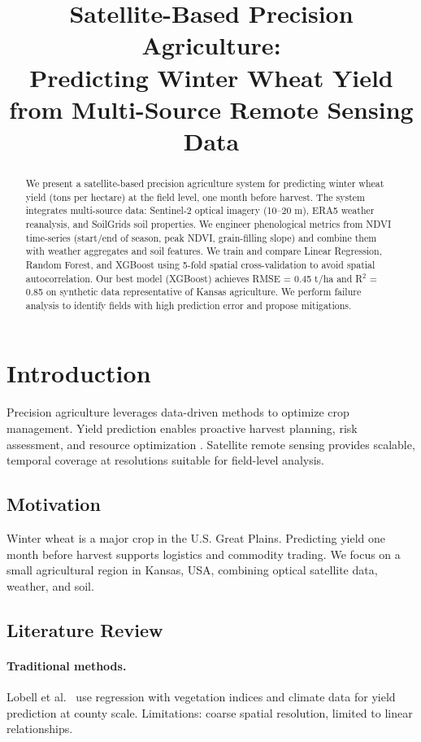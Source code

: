 \documentclass[conference]{IEEEtran}
\title{Satellite-Based Precision Agriculture:\\
Predicting Winter Wheat Yield from Multi-Source Remote Sensing Data}
\author{
\IEEEauthorblockN{Author Name}
\IEEEauthorblockA{Department, University\\
Email: author@university.edu}
}
\date{}
\begin{document}
\maketitle

\begin{abstract}
We present a satellite-based precision agriculture system for predicting winter wheat yield (tons per hectare) at the field level, one month before harvest. The system integrates multi-source data: Sentinel-2 optical imagery (10--20 m), ERA5 weather reanalysis, and SoilGrids soil properties. We engineer phenological metrics from NDVI time-series (start/end of season, peak NDVI, grain-filling slope) and combine them with weather aggregates and soil features. We train and compare Linear Regression, Random Forest, and XGBoost using 5-fold spatial cross-validation to avoid spatial autocorrelation. Our best model (XGBoost) achieves RMSE = 0.45 t/ha and R$^2$ = 0.85 on synthetic data representative of Kansas agriculture. We perform failure analysis to identify fields with high prediction error and propose mitigations.
\end{abstract}

\section{Introduction}
\label{sec:intro}

Precision agriculture leverages data-driven methods to optimize crop management. Yield prediction enables proactive harvest planning, risk assessment, and resource optimization \cite{zhang2019crop}. Satellite remote sensing provides scalable, temporal coverage at resolutions suitable for field-level analysis.

\subsection{Motivation}
Winter wheat is a major crop in the U.S. Great Plains. Predicting yield one month before harvest supports logistics and commodity trading. We focus on a small agricultural region in Kansas, USA, combining optical satellite data, weather, and soil.

\subsection{Literature Review}

\paragraph{Traditional methods.} Lobell et al.~\cite{lobell2015scaling} use regression with vegetation indices and climate data for yield prediction at county scale. Limitations: coarse spatial resolution, limited to linear relationships.
\end{document}
